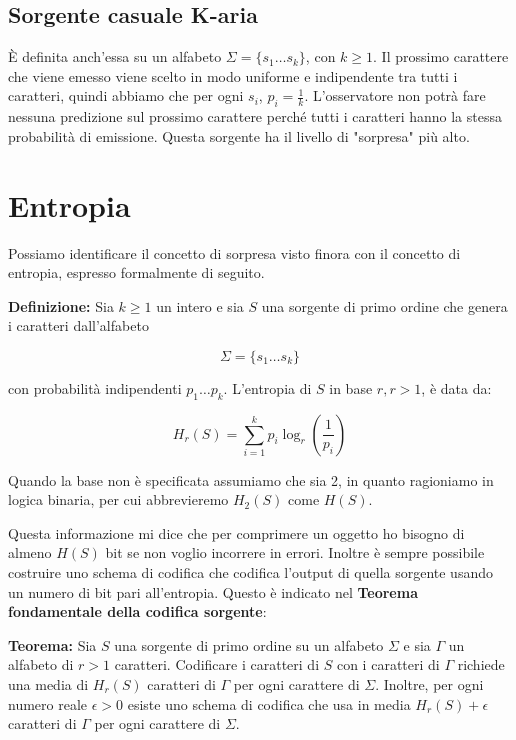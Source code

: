\subsection{Sorgente casuale K-aria}
È definita anch'essa su un alfabeto \(\Sigma = \{s_{1} \dots s_{k}\}\), con \(k \geq 1\). Il prossimo carattere che viene emesso viene scelto in modo uniforme e indipendente tra tutti i caratteri, quindi abbiamo che per ogni \(s_i\), \(p_i = \frac{1}{k}\). L'osservatore non potrà fare nessuna predizione sul prossimo carattere perché tutti i caratteri hanno la stessa probabilità di emissione. Questa sorgente ha il livello di "sorpresa" più alto.

\section{Entropia}
Possiamo identificare il concetto di sorpresa visto finora con il concetto di entropia, espresso formalmente di seguito.

\vspace{5mm}

\textbf{Definizione:} Sia \(k \geq 1\) un intero e sia \(S\) una sorgente di primo ordine che genera i caratteri dall'alfabeto

\[ \Sigma = \{s_{1} \dots s_{k}\}\]

con probabilità indipendenti \(p_{1} \dots p_{k}\). L'entropia di \(S\) in base \(r, r > 1\), è data da:

\[H_r(S) = \sum_{i=1}^k p_i \log_r \left(\frac{1}{p_i}\right)\]

Quando la base non è specificata assumiamo che sia 2, in quanto ragioniamo in logica binaria, per cui abbrevieremo \(H_2(S)\) come \(H(S)\).

Questa informazione mi dice che per comprimere un oggetto ho bisogno di almeno \(H(S)\) bit se non voglio incorrere in errori. Inoltre è sempre possibile costruire uno schema di codifica che codifica l'output di quella sorgente usando un numero di bit pari all'entropia. Questo è indicato nel \textbf{Teorema fondamentale della codifica sorgente}:

\vspace{5mm}

\textbf{Teorema:} Sia \(S\) una sorgente di primo ordine su un alfabeto \(\Sigma\) e sia \(\Gamma\) un alfabeto di \(r > 1\) caratteri. Codificare i caratteri di \(S\) con i caratteri di \(\Gamma\) richiede una media di \(H_r(S)\) caratteri di \(\Gamma\) per ogni carattere di \(\Sigma\). Inoltre, per ogni numero reale \(\epsilon > 0 \) esiste uno schema di codifica che usa in media \(H_r(S) + \epsilon\) caratteri di \(\Gamma\) per ogni carattere di \(\Sigma\).

